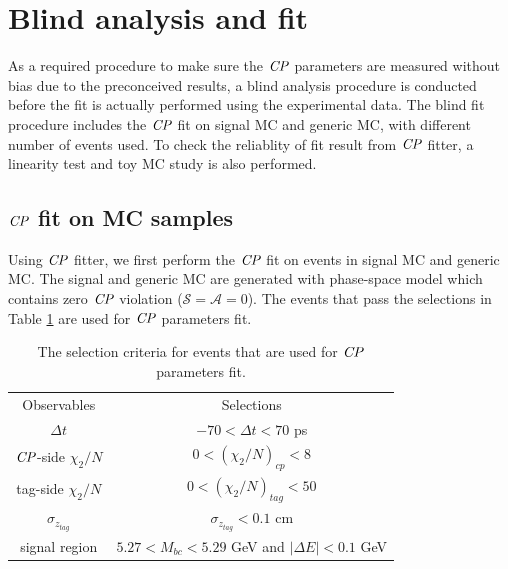 \section{Blind analysis and fit}
As a required procedure to make sure the $\it{CP}$ parameters are measured without bias due to the preconceived results, a blind analysis procedure is conducted before the fit is actually performed using the experimental data. The blind fit procedure includes the $\it{CP}$ fit on signal MC and generic MC, with different number of events used. To check the reliablity of fit result from $\it{CP}$ fitter, a linearity test and toy MC study is also performed. 

\subsection{$\it{CP}$ fit on MC samples}
Using $\it{CP}$ fitter, we first perform the $\it{CP}$ fit on events in signal MC and generic MC.
The signal and generic MC are generated with phase-space model which contains zero $\it{CP}$ violation ($\mathcal{S}=\mathcal{A}=0$). The events that pass the selections in Table \ref{tab:cutCP} are used for $\it{CP}$ parameters fit.
\begin{table}
	\centering
\begin{tabular}{c|c}
	\hline
	Observables & Selections \\
	$\Delta t$ & $-70 < \Delta t < 70$ ps\\
	$\it{CP}$-side $\chi_2/N$ & $0 < (\chi_2/N)_{cp} < 8 $ \\
	tag-side $\chi_2/N$  & $0 < (\chi_2/N)_{tag} < 50 $\\
	$\sigma_{z_{tag}}$ &  $\sigma_{z_{tag}} < 0.1$ cm\\
	signal region & $5.27 < M_{bc} < 5.29$ GeV and $|\Delta E| < 0.1$ GeV\\
	\hline

\end{tabular}
\caption{The selection criteria for events that are used for $\it{CP}$ parameters fit.}
\label{tab:cutCP}
\end{table}



